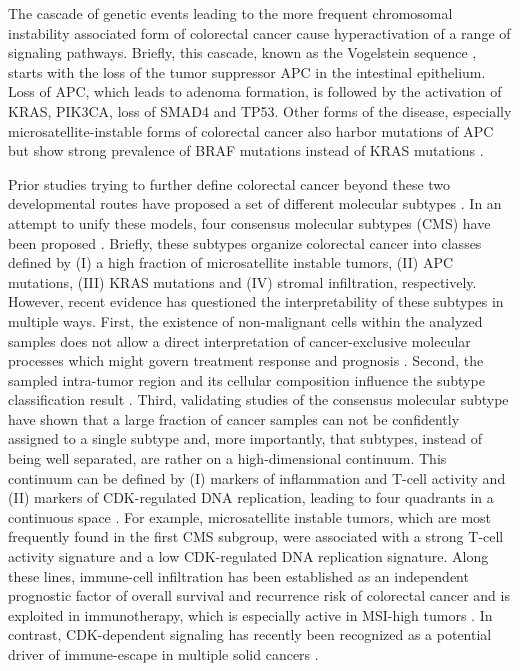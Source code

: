 \begin{flushleft}
The cascade of genetic events leading to the more frequent chromosomal instability associated form of colorectal cancer cause hyperactivation of a range of signaling pathways. Briefly, this cascade, known as the Vogelstein sequence \cite{Cho1992}, starts with the loss of the tumor suppressor APC in the intestinal epithelium. Loss of APC, which leads to adenoma formation, is followed by the activation of KRAS, PIK3CA, loss of SMAD4 and TP53. Other forms of the disease, especially microsatellite-instable forms of colorectal cancer also harbor mutations of APC but show strong prevalence of BRAF mutations instead of KRAS mutations \cite{Guinney2015TheCancer.}. \par 

Prior studies trying to further define colorectal cancer beyond these two developmental routes have proposed a set of different molecular subtypes \cite{Menter}. In an attempt to unify these models, four consensus molecular subtypes (CMS) have been proposed \cite{Guinney2015TheCancer.}. Briefly, these subtypes organize colorectal cancer into classes defined by (I) a high fraction of microsatellite instable tumors, (II) APC mutations, (III) KRAS mutations and (IV) stromal infiltration, respectively. However, recent evidence has questioned the interpretability of these subtypes in multiple ways. First, the existence of non-malignant cells within the analyzed samples does not allow a direct interpretation of cancer-exclusive molecular processes which might govern treatment response and prognosis \cite{Dunne}. Second, the sampled intra-tumor region and its cellular composition influence the subtype classification result \cite{Dunne2016ChallengingCancer.}. Third, validating studies of the consensus molecular subtype have shown that a large fraction of cancer samples can not be confidently assigned to a single subtype and, more importantly, that subtypes, instead of being well separated, are rather on a high-dimensional continuum. This continuum can be defined by (I) markers of inflammation and T-cell activity and (II) markers of CDK-regulated DNA replication, leading to four quadrants in a continuous space \cite{Ma}. For example, microsatellite instable tumors, which are most frequently found in the first CMS subgroup, were associated with a strong T-cell activity signature and a low CDK-regulated DNA replication signature. Along these lines, immune-cell infiltration has been established as an independent prognostic factor of overall survival and recurrence risk of colorectal cancer and is exploited in immunotherapy, which is especially active in MSI-high tumors \cite{galon, pages}. In contrast, CDK-dependent signaling has recently been recognized as a potential driver of immune-escape in multiple solid cancers \cite{Chaikovsky1}. \par 


\end{flushleft}
